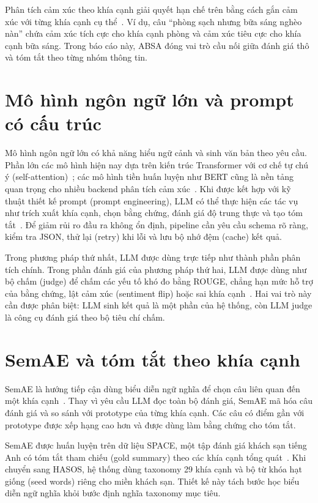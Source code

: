 \documentclass[12pt,a4paper]{report}
\begin{document}
Phân tích cảm xúc theo khía cạnh giải quyết hạn chế trên bằng cách gắn cảm xúc với từng khía cạnh cụ thể~\cite{pontiki2014semeval}. Ví dụ, câu ``phòng sạch nhưng bữa sáng nghèo nàn'' chứa cảm xúc tích cực cho khía cạnh phòng và cảm xúc tiêu cực cho khía cạnh bữa sáng. Trong báo cáo này, ABSA đóng vai trò cầu nối giữa đánh giá thô và tóm tắt theo từng nhóm thông tin.

\section{Mô hình ngôn ngữ lớn và prompt có cấu trúc}

Mô hình ngôn ngữ lớn có khả năng hiểu ngữ cảnh và sinh văn bản theo yêu cầu. Phần lớn các mô hình hiện nay dựa trên kiến trúc Transformer với cơ chế tự chú ý (self-attention)~\cite{vaswani2017attention}; các mô hình tiền huấn luyện như BERT cũng là nền tảng quan trọng cho nhiều backend phân tích cảm xúc~\cite{devlin2019bert}. Khi được kết hợp với kỹ thuật thiết kế prompt (prompt engineering), LLM có thể thực hiện các tác vụ như trích xuất khía cạnh, chọn bằng chứng, đánh giá độ trung thực và tạo tóm tắt~\cite{brown2020language,bhaskar2023prompted}. Để giảm rủi ro đầu ra không ổn định, pipeline cần yêu cầu schema rõ ràng, kiểm tra JSON, thử lại (retry) khi lỗi và lưu bộ nhớ đệm (cache) kết quả.

Trong phương pháp thứ nhất, LLM được dùng trực tiếp như thành phần phân tích chính. Trong phần đánh giá của phương pháp thứ hai, LLM được dùng như bộ chấm (judge) để chấm các yếu tố khó đo bằng ROUGE, chẳng hạn mức hỗ trợ của bằng chứng, lật cảm xúc (sentiment flip) hoặc sai khía cạnh~\cite{liu2023geval,zheng2023judging}. Hai vai trò này cần được phân biệt: LLM sinh kết quả là một phần của hệ thống, còn LLM judge là công cụ đánh giá theo bộ tiêu chí chấm.

\section{SemAE và tóm tắt theo khía cạnh}

SemAE là hướng tiếp cận dùng biểu diễn ngữ nghĩa để chọn câu liên quan đến một khía cạnh~\cite{basuroychowdhury2022sparse}. Thay vì yêu cầu LLM đọc toàn bộ đánh giá, SemAE mã hóa câu đánh giá và so sánh với prototype của từng khía cạnh. Các câu có điểm gần với prototype được xếp hạng cao hơn và được dùng làm bằng chứng cho tóm tắt.

SemAE được huấn luyện trên dữ liệu SPACE, một tập đánh giá khách sạn tiếng Anh có tóm tắt tham chiếu (gold summary) theo các khía cạnh tổng quát~\cite{angelidis2021extractive}. Khi chuyển sang HASOS, hệ thống dùng taxonomy 29 khía cạnh và bộ từ khóa hạt giống (seed words) riêng cho miền khách sạn. Thiết kế này tách bước học biểu diễn ngữ nghĩa khỏi bước định nghĩa taxonomy mục tiêu.
\end{document}
